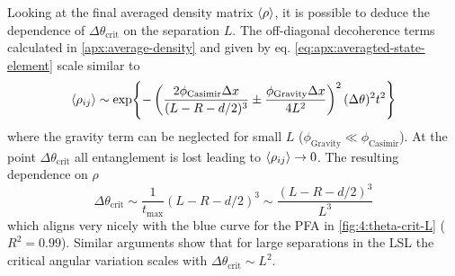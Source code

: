 Looking at the final averaged density matrix $\left\langle\rho\right\rangle$, it is possible to deduce the dependence of $\Delta \theta_\mathrm{crit}$ on the separation $L$. The off-diagonal decoherence terms calculated in \cref{apx:average-density} and given by eq. \eqref{eq:apx:averagted-state-element} scale similar to
\begin{equation}
  \left\langle\rho_{ij}\right\rangle \sim \exp{-\left(\frac{2 \phi_\mathrm{Casimir} \Delta x}{(L - R - d/2)^3} \pm \frac{\phi_\mathrm{Gravity} \Delta x}{4 L^2} \right)^2 (\Delta \theta)^2 t^2}
\end{equation}
where the gravity term can be neglected for small $L$ ($\phi_\mathrm{Gravity} \ll \phi_\mathrm{Casimir}$).
At the point $\Delta \theta_\mathrm{crit}$ all entanglement is lost leading to $\left\langle\rho_{ij}\right\rangle \rightarrow 0$. The resulting dependence on $\rho$
\begin{equation}\label{eq:4:delta-theta-scaling-L}
  \Delta \theta_\mathrm{crit} \sim \frac{1}{t_\mathrm{max}} (L - R - d/2)^3 \sim \frac{(L - R - d/2)^3}{L^3}
\end{equation}
which aligns very nicely with the blue curve for the PFA in \cref{fig:4:theta-crit-L} ($R^2 = 0.99$). Similar arguments show that for large separations in the LSL the critical angular variation scales with $\Delta \theta_\mathrm{crit} \sim L^2$.

